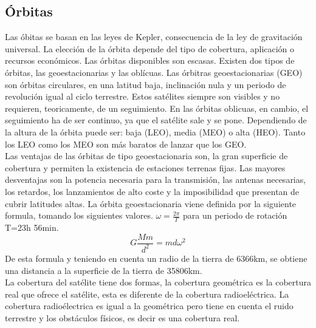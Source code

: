 	\subsection{Órbitas}
	\label{sub:orbitas}
		Las óbitas se basan en las leyes de Kepler, consecuencia de la ley de gravitación universal. La elección de la órbita depende del tipo de cobertura, aplicación o recursos económicos. Las órbitas disponibles son escasas. Existen dos tipos de órbitas, las geoestacionarias y las oblícuas. Las órbitras geoestacionarias (GEO) son órbitas circulares, en una latitud baja, inclinación nula y un periodo de revolución igual al ciclo terrestre. Estos satélites siempre son visibles y no requieren, teoricamente, de un seguimiento. En las órbitas oblicuas, en cambio, el seguimiento ha de ser continuo, ya que el satélite sale y se pone. Dependiendo de la altura de la órbita puede ser: baja (LEO), media (MEO) o alta (HEO). Tanto los LEO como los MEO son más baratos de lanzar que los GEO.\\
		Las ventajas de las órbitas de tipo geoestacionaria son, la gran superficie de cobertura y permiten la existencia de estaciones terrenas fijas. Las mayores desventajas son la potencia necesaria para la transmisión, las antenas necesarias, los retardos, los lanzamientos de alto coste y la imposibilidad que presentan de cubrir latitudes altas.
		La órbita geoestacionaria viene definida por la siguiente formula, tomando los siguientes valores. $\omega=\frac{2\pi}{T}$ para un periodo de rotación T=23h 56min.
		\[G\frac{Mm}{d^2}=md\omega^2\]
		De esta formula y teniendo en cuenta un radio de la tierra de 6366km, se obtiene una distancia a la superficie de la tierra de 35806km.\\
		La cobertura del satélite tiene dos formas, la cobertura geométrica es la cobertura real que ofrece el satélite, esta es diferente de la cobertura radioeléctrica. La cobertura radioélectrica es igual a la geométrica pero tiene en cuenta el ruido terrestre y los obstáculos físicos, es decir es una cobertura real.
